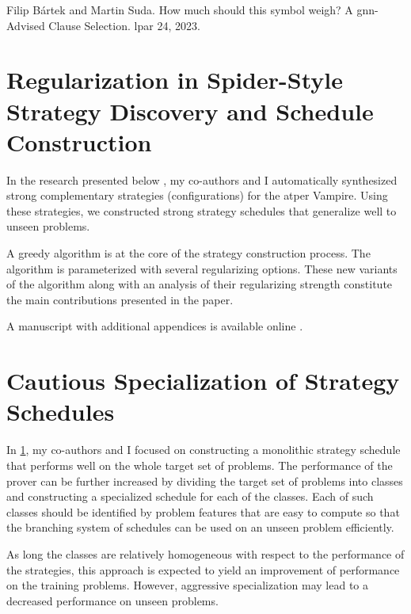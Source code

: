 Filip Bártek and Martin Suda.
How much should this symbol weigh? A \acrshort{gnn}-Advised Clause Selection.
\Acrlong{lpar} 24, 2023.
\cite{DBLP:conf/lpar/Bartek023}


\section{Regularization in Spider-Style Strategy Discovery and Schedule Construction}
\label{sec:results:regularization}

In the research presented below \cite{DBLP:conf/ijcar/BartekCS24},
my co-authors and I automatically synthesized strong complementary strategies (configurations) for the \gls{atper} Vampire.
Using these strategies,
we constructed strong strategy schedules that generalize well to unseen problems.

A greedy algorithm is at the core of the strategy construction process.
The algorithm is parameterized with several regularizing options.
These new variants of the algorithm along with an analysis of their regularizing strength
constitute the main contributions presented in the paper.

A manuscript with additional appendices is available online \cite{DBLP:journals/corr/abs-2403-12869}.


\section{Cautious Specialization of Strategy Schedules}
\label{sec:results:cautious}

In \cref{sec:results:regularization},
my co-authors and I focused on constructing a monolithic strategy schedule that performs well on the whole target set of problems.
The performance of the prover can be further increased by dividing the target set of problems into classes
and constructing a specialized schedule for each of the classes.
Each of such classes should be identified by problem features that are easy to compute
so that the branching system of schedules can be used on an unseen problem efficiently.

As long the classes are relatively homogeneous with respect to the performance of the strategies,
this approach is expected to yield an improvement of performance on the training problems.
However, aggressive specialization may lead to a decreased performance on unseen problems.

